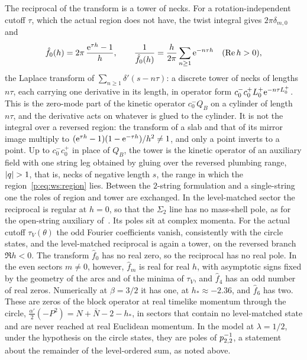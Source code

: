The reciprocal of the transform is a tower of necks.
For a rotation-independent cutoff $\tau$, which the actual region does not have, the twist integral gives $2 \pi \delta_{m, 0}$ and
\begin{equation}
  \label{p:eq:ws:tower}
  \hat f_0(h)
    = 2 \pi \, \frac{\mathrm{e}^{\tau h} - 1}{h},
  \qquad
  \frac{1}{\hat f_0(h)}
    = \frac{h}{2 \pi} \sum_{n \ge 1} \mathrm{e}^{- n \tau h}
  \quad (\operatorname{Re} h > 0),
\end{equation}
the Laplace transform of $\sum_{n \ge 1} \delta'(s - n \tau)$: a discrete tower of necks of lengths $n \tau$, each carrying one derivative in its length, in operator form $c_0^- c_0^+ L_0^+ \mathrm{e}^{- n \tau L_0^+}$.
This is the zero-mode part of the kinetic operator $c_0^- Q_B$ on a cylinder of length $n \tau$, and the derivative acts on whatever is glued to the cylinder.
It is not the integral over a reversed region: the transform of a slab and that of its mirror image multiply to $(\mathrm{e}^{\tau h} - 1)(1 - \mathrm{e}^{- \tau h}) / h^2 \neq 1$, and only a point inverts to a point.
Up to $c_0^- c_0^+$ in place of $Q_B$, the tower is the kinetic operator of an auxiliary field with one string leg obtained by gluing over the reversed plumbing range, ${|q|} > 1$, that is, necks of negative length $s$, the range in which the region~\eqref{p:eq:ws:region} lies.
Between the $2$-string formulation and a single-string one the roles of region and tower are exchanged.
In the level-matched sector the reciprocal is regular at $h = 0$, so that the $\Sigma_2$ line has no mass-shell pole, as for the open-string auxiliary of~\cite{Erbin:2024:OpenStringStub}.
Its poles sit at complex momenta.
For the actual cutoff $\tau_V(\theta)$ the odd Fourier coefficients vanish, consistently with the circle states, and the level-matched reciprocal is again a tower, on the reversed branch $\Re h < 0$.
The transform $\hat f_0$ has no real zero, so the reciprocal has no real pole.
In the even sectors $m \neq 0$, however, $\hat f_m$ is real for real $h$, with asymptotic signs fixed by the geometry of the arcs and of the minima of $\tau_V$, and $\hat f_4$ has an odd number of real zeros.
Numerically at $\beta = 3 / 2$ it has one, at $h_* \approx - 2.36$, and $\hat f_6$ has two.
These are zeros of the block operator at real timelike momentum through the circle, $\tfrac{\alpha'}{2} (- P^2) = N + \bar N - 2 - h_*$, in sectors that contain no level-matched state and are never reached at real Euclidean momentum.
In the model at $\lambda = 1 / 2$, under the hypothesis on the circle states, they are poles of $p_{2,2}^{-1}$, a statement about the remainder of the level-ordered sum, as noted above.
